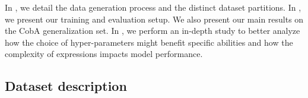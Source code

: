 


In , we detail the data generation process and the distinct dataset partitions. In , we present our training and evaluation setup. We also present our main results on the CobA generalization set. In , we perform an in-depth study to better analyze how the choice of hyper-parameters might benefit specific abilities and how the complexity of expressions impacts model performance.



\subsection{Dataset description}



